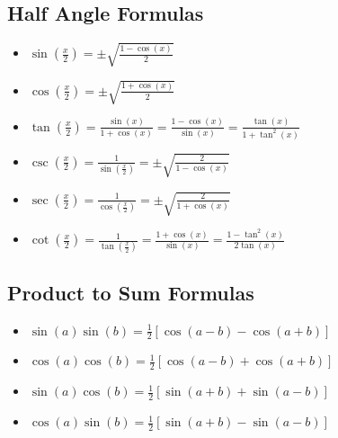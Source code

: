 \subsection{Half Angle Formulas}

\begin{itemize}

    \item \( \sin\left(\frac{x}{2}\right) = \pm\sqrt{\frac{1 - \cos(x)}{2}} \)

    \item \( \cos\left(\frac{x}{2}\right) = \pm\sqrt{\frac{1 + \cos(x)}{2}} \)

    \item \( \tan\left(\frac{x}{2}\right) = \frac{\sin(x)}{1 + \cos(x)} = \frac{1 - \cos(x)}{\sin(x)} = \frac{\tan(x)}{1 + \tan^2(x)}\)

    \item \( \csc\left(\frac{x}{2}\right) = \frac{1}{\sin\left(\frac{x}{2}\right)} = \pm\sqrt{\frac{2}{1 - \cos(x)}} \)

    \item \( \sec\left(\frac{x}{2}\right) = \frac{1}{\cos\left(\frac{x}{2}\right)} = \pm\sqrt{\frac{2}{1 + \cos(x)}} \)

    \item \( \cot\left(\frac{x}{2}\right) = \frac{1}{\tan\left(\frac{x}{2}\right)} = \frac{1 + \cos(x)}{\sin(x)} = \frac{1 - \tan^2(x)}{2\tan(x)}\)

\end{itemize}

\subsection{Product to Sum Formulas}

\begin{itemize}

    \item \( \sin(a)\sin(b) = \frac{1}{2}[\cos(a - b) - \cos(a + b)] \)

    \item \( \cos(a)\cos(b) = \frac{1}{2}[\cos(a - b) + \cos(a + b)] \)

    \item \( \sin(a)\cos(b) = \frac{1}{2}[\sin(a + b) + \sin(a - b)] \)

    \item \( \cos(a)\sin(b) = \frac{1}{2}[\sin(a + b) - \sin(a - b)] \)

\end{itemize}

